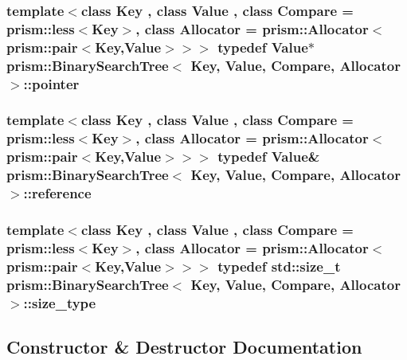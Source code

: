 \subsubsection[{\texorpdfstring{pointer}{pointer}}]{\setlength{\rightskip}{0pt plus 5cm}template$<$class Key , class Value , class Compare  = prism\+::less$<$\+Key$>$, class Allocator  = prism\+::\+Allocator$<$prism\+::pair$<$\+Key,\+Value$>$$>$$>$ typedef Value$\ast$ {\bf prism\+::\+Binary\+Search\+Tree}$<$ Key, Value, Compare, {\bf Allocator} $>$\+::{\bf pointer}}\hypertarget{classprism_1_1_binary_search_tree_a159239eef3483ff85766b65e3cc8b36a}{}\label{classprism_1_1_binary_search_tree_a159239eef3483ff85766b65e3cc8b36a}
\subsubsection[{\texorpdfstring{reference}{reference}}]{\setlength{\rightskip}{0pt plus 5cm}template$<$class Key , class Value , class Compare  = prism\+::less$<$\+Key$>$, class Allocator  = prism\+::\+Allocator$<$prism\+::pair$<$\+Key,\+Value$>$$>$$>$ typedef Value\& {\bf prism\+::\+Binary\+Search\+Tree}$<$ Key, Value, Compare, {\bf Allocator} $>$\+::{\bf reference}}\hypertarget{classprism_1_1_binary_search_tree_ab924eeab8b8ce1edf77d02bceec9d4eb}{}\label{classprism_1_1_binary_search_tree_ab924eeab8b8ce1edf77d02bceec9d4eb}
\subsubsection[{\texorpdfstring{size\+\_\+type}{size_type}}]{\setlength{\rightskip}{0pt plus 5cm}template$<$class Key , class Value , class Compare  = prism\+::less$<$\+Key$>$, class Allocator  = prism\+::\+Allocator$<$prism\+::pair$<$\+Key,\+Value$>$$>$$>$ typedef std\+::size\+\_\+t {\bf prism\+::\+Binary\+Search\+Tree}$<$ Key, Value, Compare, {\bf Allocator} $>$\+::{\bf size\+\_\+type}}\hypertarget{classprism_1_1_binary_search_tree_a757953cb7af54c9b07cf8a8a0fecb58f}{}\label{classprism_1_1_binary_search_tree_a757953cb7af54c9b07cf8a8a0fecb58f}


\subsection{Constructor \& Destructor Documentation}
